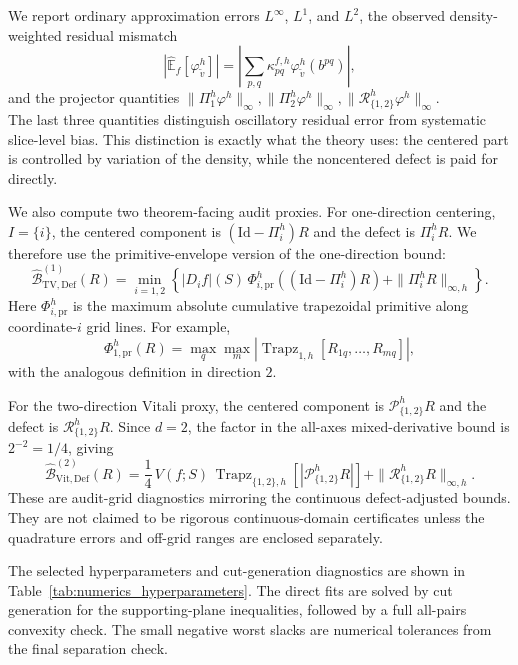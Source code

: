\documentclass[11pt,letterpaper]{article}
\theoremstyle{definition}
\theoremstyle{remark}
\newcommand{\Id}{\mathrm{Id}}
\begin{document}
We report ordinary approximation errors $L^\infty$, $L^1$, and $L^2$, the
observed density-weighted residual mismatch
$$
|\widehat{\mathbb E}_f[\varphi_{\widetilde v}^h]|
=
\left|
\sum_{p,q}
\kappa_{pq}^{f,h}\varphi_{\widetilde v}^h(b^{pq})
\right|,
$$
and the projector quantities
$
\|\Pi_1^h\varphi^h\|_\infty,
\|\Pi_2^h\varphi^h\|_\infty,
\|\mathcal R_{\{1,2\}}^h\varphi^h\|_\infty.
$\\
The last three quantities distinguish oscillatory residual error from
systematic slice-level bias. This distinction is exactly what the theory uses:
the centered part is controlled by variation of the density, while the
noncentered defect is paid for directly.

We also compute two theorem-facing audit proxies. For one-direction centering,
$I=\{i\}$, the centered component is $(\Id-\Pi_i^h)R$ and the defect is
$\Pi_i^hR$. We therefore use the primitive-envelope version of the
one-direction bound:
$$
\widehat{\mathcal B}^{(1)}_{\mathrm{TV},\mathrm{Def}}(R)
=
\min_{i=1,2}
\left\{
|D_i f|(S)\,
\Phi_{i,\mathrm{pr}}^h((\Id-\Pi_i^h)R)
+
\|\Pi_i^hR\|_{\infty,h}
\right\}.
$$
Here $\Phi_{i,\mathrm{pr}}^h$ is the maximum absolute cumulative trapezoidal
primitive along coordinate-$i$ grid lines. For example,
$$
\Phi_{1,\mathrm{pr}}^h(R)
=
\max_q\max_m
\left|
\operatorname{Trapz}_{1,h}
\left[
R_{1q},\ldots,R_{mq}
\right]
\right|,
$$
with the analogous definition in direction $2$.

For the two-direction Vitali proxy, the centered component is
$\mathcal P_{\{1,2\}}^hR$ and the defect is
$\mathcal R_{\{1,2\}}^hR$. Since $d=2$, the factor in the all-axes
mixed-derivative bound is $2^{-2}=1/4$, giving
$$
\widehat{\mathcal B}^{(2)}_{\mathrm{Vit},\mathrm{Def}}(R)
=
\frac14\,
V(f;S)\,
\operatorname{Trapz}_{\{1,2\},h}
\left[
|\mathcal P_{\{1,2\}}^hR|
\right]
+
\|\mathcal R_{\{1,2\}}^hR\|_{\infty,h}.
$$
These are audit-grid diagnostics mirroring the continuous defect-adjusted
bounds. They are not claimed to be rigorous continuous-domain certificates
unless the quadrature errors and off-grid ranges are enclosed separately.

The selected hyperparameters and cut-generation diagnostics are shown in
Table~\ref{tab:numerics_hyperparameters}. The direct fits are solved by cut
generation for the supporting-plane inequalities, followed by a full all-pairs
convexity check. The small negative worst slacks are numerical tolerances from
the final separation check.
\end{document}
